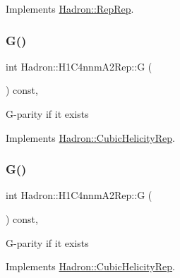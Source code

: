 Implements \mbox{\hyperlink{structHadron_1_1RepRep_a92c8802e5ed7afd7da43ccfd5b7cd92b}{Hadron\+::\+Rep\+Rep}}.

\mbox{\label{structHadron_1_1H1C4nnmA2Rep_a7d26d361c13d0d609075c46c0ea7bc10}} 
\subsubsection{\texorpdfstring{G()}{G()}\hspace{0.1cm}{\footnotesize\ttfamily [1/3]}}
{\footnotesize\ttfamily int Hadron\+::\+H1\+C4nnm\+A2\+Rep\+::G (\begin{DoxyParamCaption}{ }\end{DoxyParamCaption}) const\hspace{0.3cm}{\ttfamily [inline]}, {\ttfamily [virtual]}}

G-\/parity if it exists 

Implements \mbox{\hyperlink{structHadron_1_1CubicHelicityRep_a50689f42be1e6170aa8cf6ad0597018b}{Hadron\+::\+Cubic\+Helicity\+Rep}}.

\mbox{\label{structHadron_1_1H1C4nnmA2Rep_a7d26d361c13d0d609075c46c0ea7bc10}} 
\subsubsection{\texorpdfstring{G()}{G()}\hspace{0.1cm}{\footnotesize\ttfamily [2/3]}}
{\footnotesize\ttfamily int Hadron\+::\+H1\+C4nnm\+A2\+Rep\+::G (\begin{DoxyParamCaption}{ }\end{DoxyParamCaption}) const\hspace{0.3cm}{\ttfamily [inline]}, {\ttfamily [virtual]}}

G-\/parity if it exists 

Implements \mbox{\hyperlink{structHadron_1_1CubicHelicityRep_a50689f42be1e6170aa8cf6ad0597018b}{Hadron\+::\+Cubic\+Helicity\+Rep}}.

\mbox{\label{structHadron_1_1H1C4nnmA2Rep_a7d26d361c13d0d609075c46c0ea7bc10}} 

